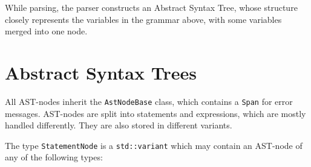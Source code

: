 \documentclass[a4paper]{article}
\newcommand*{\code}[1]{\texttt{#1}}
\begin{document}
While parsing, the parser constructs an Abstract Syntax Tree, 
whose structure closely represents the variables in the grammar 
above, with some variables merged into one node.

\clearpage
\label{sect:AST}
\section{Abstract Syntax Trees}

All AST-nodes inherit the \code{AstNodeBase} class, which contains 
a \code{Span} for error messages. AST-nodes are split into 
statements and expressions, which are mostly handled differently.
They are also stored in different variants.

The type \code{StatementNode} is a 
\code{std::variant} which may contain an AST-node of any of the 
following types:
\end{document}
